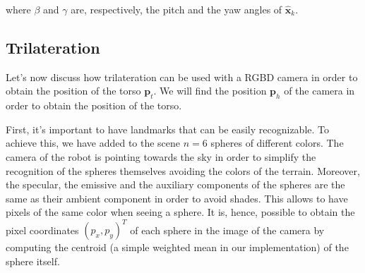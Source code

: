 \documentclass[a4paper]{article}
\begin{document}

\noindent where $\beta$ and $\gamma$ are, respectively,
the pitch and the yaw angles of $\bm{\hat{x}}_{k}$.

\subsection{Trilateration}
\label{subsec:trilateration}
Let's now discuss how
trilateration\cite{trilateration-hereman-1995} can be used with
a RGBD camera in order to obtain the position of the torso
$\bm{p}_t$. We will find the position $\bm{p}_h$ of the camera
in order to obtain the position of the torso.

First, it's important to have landmarks that can be
easily recognizable. To achieve this, we have added to the scene
$n=6$ spheres of different colors. The camera of the robot is
pointing towards the
sky in order to simplify the recognition of the spheres
themselves avoiding the colors of the terrain.
Moreover, the specular, the emissive and the auxiliary
components of the spheres are the same as their ambient component
in order to avoid shades. This allows to have pixels of the same
color when seeing a sphere. It is, hence, possible to obtain
the pixel coordinates $(p_x, p_y)^T$ of each sphere in the image
of the camera by computing the centroid (a simple weighted mean
in our implementation) of the sphere itself.
\end{document}
